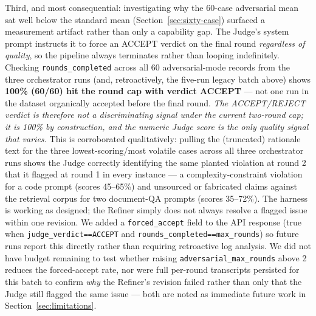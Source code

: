 \documentclass{article}
\begin{document}
Third, and most consequential: investigating why the 60-case adversarial mean sat well below
the standard mean (Section~\ref{sec:sixty-case}) surfaced a measurement artifact rather than
only a capability gap. The Judge's system prompt instructs it to force an ACCEPT verdict on the
final round \emph{regardless of quality}, so the pipeline always terminates rather than looping
indefinitely. Checking \texttt{rounds\_completed} across all 60 adversarial-mode records from
the three orchestrator runs (and, retroactively, the five-run legacy batch above) shows
\textbf{100\% (60/60) hit the round cap with verdict ACCEPT} --- not one run in the dataset
organically accepted before the final round. \emph{The ACCEPT/REJECT verdict is therefore not a
discriminating signal under the current two-round cap; it is 100\% by construction, and the
numeric Judge score is the only quality signal that varies.} This is corroborated qualitatively:
pulling the (truncated) rationale text for the three lowest-scoring/most volatile cases across
all three orchestrator runs shows the Judge correctly identifying the same planted violation at
round 2 that it flagged at round 1 in every instance --- a complexity-constraint violation for a
code prompt (scores 45--65\%) and unsourced or fabricated claims against the retrieval corpus
for two document-QA prompts (scores 35--72\%). The harness is working as designed; the Refiner
simply does not always resolve a flagged issue within one revision. We added a
\texttt{forced\_accept} field to the API response (true when
\texttt{judge\_verdict==ACCEPT} and \texttt{rounds\_completed==max\_rounds}) so future runs
report this directly rather than requiring retroactive log analysis. We did not have budget
remaining to test whether raising \texttt{adversarial\_max\_rounds} above 2 reduces the
forced-accept rate, nor were full per-round transcripts persisted for this batch to confirm
\emph{why} the Refiner's revision failed rather than only that the Judge still flagged the same
issue --- both are noted as immediate future work in Section~\ref{sec:limitations}.
\end{document}
